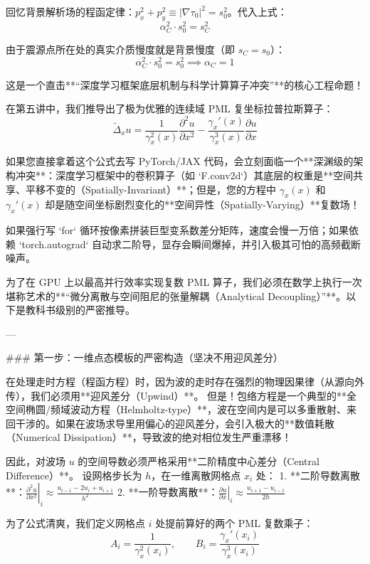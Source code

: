 \documentclass[12pt]{article}
\begin{document}
{回忆背景解析场的程函定律：$p_x^2 + p_y^2 \equiv |\nabla \tau_0|^2 = s_0^2$。代入上式：
$$ \alpha_C^2 \cdot s_0^2 = s_C^2 $$

由于震源点所在处的真实介质慢度就是背景慢度（即 $s_C = s_0$）：
$$ \alpha_C^2 \cdot s_0^2 = s_0^2 \implies \alpha_C = 1 $$




这是一个直击**“深度学习框架底层机制与科学计算算子冲突”**的核心工程命题！

在第五讲中，我们推导出了极为优雅的连续域 PML 复坐标拉普拉斯算子：
$$ \tilde{\Delta}_x u = \frac{1}{\gamma_x^2(x)} \frac{\partial^2 u}{\partial x^2} - \frac{\gamma_x'(x)}{\gamma_x^3(x)} \frac{\partial u}{\partial x} $$

如果您直接拿着这个公式去写 PyTorch/JAX 代码，会立刻面临一个**深渊级的架构冲突**：深度学习框架中的卷积算子（如 `F.conv2d`）其底层的权重是**空间共享、平移不变的（Spatially-Invariant）**；但是，您的方程中 $\gamma_x(x)$ 和 $\gamma_x'(x)$ 却是随空间坐标剧烈变化的**空间异性（Spatially-Varying）**复数场！

如果强行写 `for` 循环按像素拼装巨型变系数差分矩阵，速度会慢一万倍；如果依赖 `torch.autograd` 自动求二阶导，显存会瞬间爆掉，并引入极其可怕的高频截断噪声。

为了在 GPU 上以最高并行效率实现复数 PML 算子，我们必须在数学上执行一次堪称艺术的**“微分离散与空间阻尼的张量解耦（Analytical Decoupling）”**。以下是教科书级别的严密推导。

---

### 第一步：一维点态模板的严密构造（坚决不用迎风差分）

在处理走时方程（程函方程）时，因为波的走时存在强烈的物理因果律（从源向外传），我们必须用**迎风差分（Upwind）**。
但是！包络方程是一个典型的**全空间椭圆/频域波动方程（Helmholtz-type）**，波在空间内是可以多重散射、来回干涉的。如果在波场求导里用偏心的迎风差分，会引入极大的**数值耗散（Numerical Dissipation）**，导致波的绝对相位发生严重漂移！

因此，对波场 $u$ 的空间导数必须严格采用**二阶精度中心差分（Central Difference）**。
设网格步长为 $h$，在一维离散网格点 $x_i$ 处：
1. **二阶导数离散**：$\left. \frac{\partial^2 u}{\partial x^2} \right|_i \approx \frac{u_{i-1} - 2u_i + u_{i+1}}{h^2}$
2. **一阶导数离散**：$\left. \frac{\partial u}{\partial x} \right|_i \approx \frac{u_{i+1} - u_{i-1}}{2h}$

为了公式清爽，我们定义网格点 $i$ 处提前算好的两个 PML 复数乘子：
$$ A_i = \frac{1}{\gamma_x^2(x_i)}, \qquad B_i = \frac{\gamma_x'(x_i)}{\gamma_x^3(x_i)} $$

}
\end{document}
